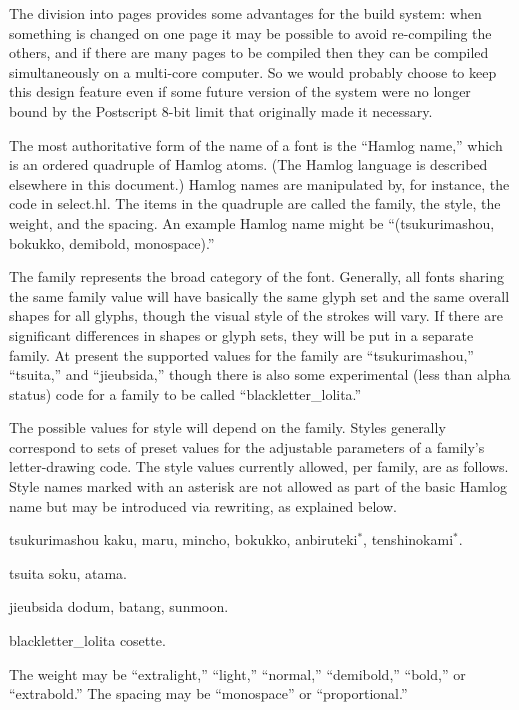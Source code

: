 \documentclass[14pt]{extarticle}
\begin{document}
The division into pages provides some advantages for the build system: when
something is changed on one page it may be possible to avoid re-compiling
the others, and if there are many pages to be compiled then they can be
compiled simultaneously on a multi-core computer.  So we would probably
choose to keep this design feature even if some future version of the system
were no longer bound by the Postscript 8-bit limit that originally made it
necessary.

The most authoritative form of the name of a font is the ``Hamlog name,''
which is an ordered quadruple of Hamlog atoms.  (The Hamlog language is
described elsewhere in this document.)  Hamlog names are manipulated
by, for instance, the code in select.hl.  The items in the quadruple are
called the family, the style, the weight, and the spacing.  An example
Hamlog name might be ``(tsukurimashou, bokukko, demibold, monospace).''

The family represents the broad category of the font.  Generally, all fonts
sharing the same family value will have basically the same glyph set and the
same overall shapes for all glyphs, though the visual style of the strokes
will vary.  If there are significant differences in shapes or glyph sets,
they will be put in a separate family.  At present the supported values for
the family are ``tsukurimashou,'' ``tsuita,'' and ``jieubsida,'' though
there is also some experimental (less than alpha status) code for a
family to be called ``blackletter\_lolita.''

The possible values for style will depend on the family.  Styles generally
correspond to sets of preset values for the adjustable parameters of a
family's letter-drawing code.  The style values currently allowed, per
family, are as follows.  Style names marked with an asterisk are not allowed
as part of the basic Hamlog name but may be introduced via rewriting, as
explained below.
\begin{description}
  \item{tsukurimashou} kaku, maru, mincho, bokukko, anbiruteki$^*$,
    tenshinokami$^*$.
  \item{tsuita} soku, atama.
  \item{jieubsida} dodum, batang, sunmoon.
  \item{blackletter\_lolita} cosette.
\end{description}

The weight may be ``extralight,'' ``light,'' ``normal,'' ``demibold,''
``bold,'' or ``extrabold.''  The spacing may be ``monospace'' or
``proportional.''
\end{document}

